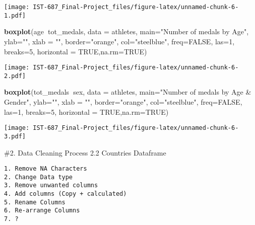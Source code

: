 \documentclass[]{article}
\newenvironment{Shaded}{\begin{snugshade}}{\end{snugshade}}
\newcommand{\DataTypeTok}[1]{\textcolor[rgb]{0.13,0.29,0.53}{#1}}
\newcommand{\DecValTok}[1]{\textcolor[rgb]{0.00,0.00,0.81}{#1}}
\newcommand{\KeywordTok}[1]{\textcolor[rgb]{0.13,0.29,0.53}{\textbf{#1}}}
\newcommand{\NormalTok}[1]{#1}
\newcommand{\OperatorTok}[1]{\textcolor[rgb]{0.81,0.36,0.00}{\textbf{#1}}}
\newcommand{\OtherTok}[1]{\textcolor[rgb]{0.56,0.35,0.01}{#1}}
\newcommand{\StringTok}[1]{\textcolor[rgb]{0.31,0.60,0.02}{#1}}
\begin{document}
\texttt{[image: IST-687\_Final-Project\_files/figure-latex/unnamed-chunk-6-1.pdf]}

\begin{Shaded}
\begin{Highlighting}[]
\KeywordTok{boxplot}\NormalTok{(age}\OperatorTok{~}\NormalTok{tot_medals,}
       \DataTypeTok{data =}\NormalTok{ athletes, }\DataTypeTok{main=}\StringTok{"Number of medals by Age"}\NormalTok{, }
       \DataTypeTok{ylab=}\StringTok{""}\NormalTok{,}
       \DataTypeTok{xlab =} \StringTok{""}\NormalTok{,}
       \DataTypeTok{border=}\StringTok{"orange"}\NormalTok{, }
       \DataTypeTok{col=}\StringTok{"steelblue"}\NormalTok{,}
       \DataTypeTok{freq=}\OtherTok{FALSE}\NormalTok{,}
       \DataTypeTok{las=}\DecValTok{1}\NormalTok{, }
       \DataTypeTok{breaks=}\DecValTok{5}\NormalTok{,}
       \DataTypeTok{horizontal =} \OtherTok{TRUE}\NormalTok{,}\DataTypeTok{na.rm=}\OtherTok{TRUE}\NormalTok{)}
\end{Highlighting}
\end{Shaded}

\texttt{[image: IST-687\_Final-Project\_files/figure-latex/unnamed-chunk-6-2.pdf]}

\begin{Shaded}
\begin{Highlighting}[]
\KeywordTok{boxplot}\NormalTok{(tot_medals}\OperatorTok{~}\NormalTok{sex,}
       \DataTypeTok{data =}\NormalTok{ athletes, }\DataTypeTok{main=}\StringTok{"Number of medals by Age & Gender"}\NormalTok{, }
       \DataTypeTok{ylab=}\StringTok{""}\NormalTok{,}
       \DataTypeTok{xlab =} \StringTok{""}\NormalTok{,}
       \DataTypeTok{border=}\StringTok{"orange"}\NormalTok{, }
       \DataTypeTok{col=}\StringTok{"steelblue"}\NormalTok{,}
       \DataTypeTok{freq=}\OtherTok{FALSE}\NormalTok{,}
       \DataTypeTok{las=}\DecValTok{1}\NormalTok{, }
       \DataTypeTok{breaks=}\DecValTok{5}\NormalTok{,}
       \DataTypeTok{horizontal =} \OtherTok{TRUE}\NormalTok{,}\DataTypeTok{na.rm=}\OtherTok{TRUE}\NormalTok{)}
\end{Highlighting}
\end{Shaded}

\texttt{[image: IST-687\_Final-Project\_files/figure-latex/unnamed-chunk-6-3.pdf]}

\#2. Data Cleaning Process \textbar{} 2.2 Countries Dataframe

\begin{verbatim}
1. Remove NA Characters
2. Change Data type 
3. Remove unwanted columns
4. Add columns (Copy + calculated)
5. Rename Columns
6. Re-arrange Columns
7. ?
\end{verbatim}
\end{document}

